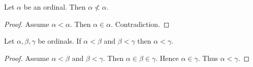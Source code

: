 \documentclass[10pt]{article}
\begin{document}
  \begin{forthel}
    \begin{proposition}[id=SET_THEORY_02_6229364135952384,printid]
      Let $\alpha$ be an ordinal.
      Then $\alpha \nless \alpha$.
    \end{proposition}
    \begin{proof}
      Assume $\alpha < \alpha$.
      Then $\alpha \in \alpha$.
      Contradiction.
    \end{proof}
  \end{forthel}

  \begin{forthel}
    \begin{proposition}[id=SET_THEORY_02_7098683017396224,printid]
      Let $\alpha, \beta, \gamma$ be ordinals.
      If $\alpha < \beta$ and $\beta < \gamma$ then $\alpha < \gamma$.
    \end{proposition}
    \begin{proof}
      Assume $\alpha < \beta$ and $\beta < \gamma$.
      Then $\alpha \in \beta \in \gamma$.
      Hence $\alpha \in \gamma$.
      Thus $\alpha < \gamma$.
    \end{proof}
  \end{forthel}
\end{document}
